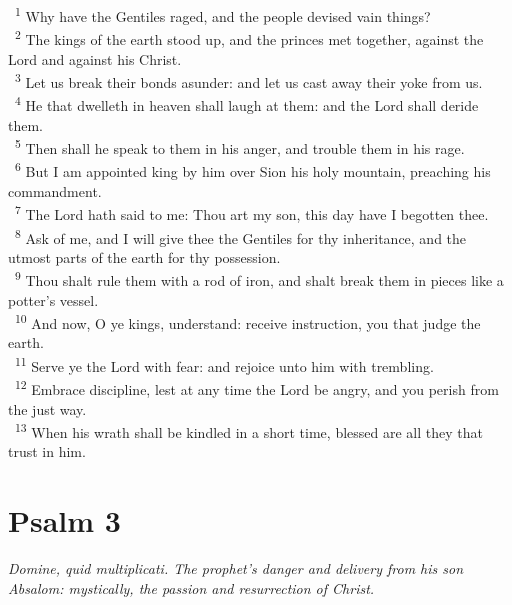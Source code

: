 \documentclass[a5paper,12pt]{article}
\begin{document}
\begin{multicols*}{2}
~\textsuperscript{1} Why have the Gentiles raged, and the people devised vain things?\\
~\textsuperscript{2} The kings of the earth stood up, and the princes met together, against the Lord and against his Christ.\\
~\textsuperscript{3} Let us break their bonds asunder: and let us cast away their yoke from us.\\
~\textsuperscript{4} He that dwelleth in heaven shall laugh at them: and the Lord shall deride them.\\
~\textsuperscript{5} Then shall he speak to them in his anger, and trouble them in his rage.\\
~\textsuperscript{6} But I am appointed king by him over Sion his holy mountain, preaching his commandment.\\
~\textsuperscript{7} The Lord hath said to me: Thou art my son, this day have I begotten thee.\\
~\textsuperscript{8} Ask of me, and I will give thee the Gentiles for thy inheritance, and the utmost parts of the earth for thy possession.\\
~\textsuperscript{9} Thou shalt rule them with a rod of iron, and shalt break them in pieces like a potter's vessel.\\
~\textsuperscript{10} And now, O ye kings, understand: receive instruction, you that judge the earth.\\
~\textsuperscript{11} Serve ye the Lord with fear: and rejoice unto him with trembling.\\
~\textsuperscript{12} Embrace discipline, lest at any time the Lord be angry, and you perish from the just way.\\
~\textsuperscript{13} When his wrath shall be kindled in a short time, blessed are all they that trust in him.\\

\section{Psalm 3}
\label{sec:org46222e1}
\emph{Domine, quid multiplicati. The prophet's danger and delivery from his son Absalom: mystically, the passion and resurrection of Christ.}\\


\end{multicols*}
\end{document}
